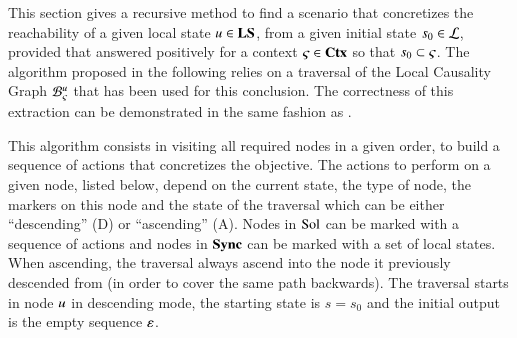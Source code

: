 This section gives a recursive method to find a scenario that concretizes
the reachability of a given local state $u \in \mathbf{LS}$,
from a given initial state $s_0 \in \mathcal{L}$,
provided that  answered positively
for a context $\varsigma \in \mathbf{Ctx}$ so that $s_0 \subset \varsigma$.
The algorithm proposed in the following relies on a traversal of the Local Causality Graph
${\mathcal{B}_{\varsigma}^{u}}$ that has been used for this conclusion.
The correctness of this extraction can be demonstrated
in the same fashion as .

This algorithm consists in visiting all required nodes in a given order,
to build a sequence of actions that concretizes the objective.
The actions to perform on a given node,
listed below,
depend on the current state, the type of node, the markers on this node
and the state of the traversal which can be either “descending” (D) or “ascending” (A).
Nodes in $\mathrm{Sol}$ can be marked with a sequence of actions
and nodes in $\mathbf{Sync}$ can be marked with a set of local states.
When ascending, the traversal always ascend into the node it previously descended from
(in order to cover the same path backwards).
The traversal starts in node $u$ in descending mode,
the starting state is $s = s_0$
and the initial output is the empty sequence $\varepsilon$.


